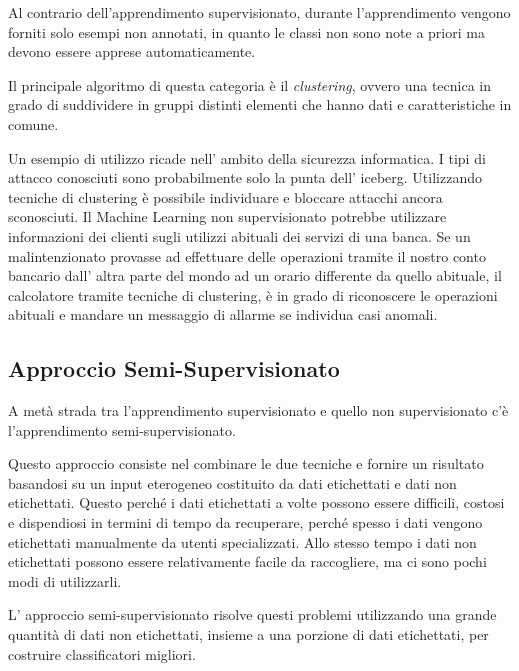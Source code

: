 \documentclass[a4paper,12pt]{report}
\begin{document}


Al contrario dell'apprendimento supervisionato, durante l'apprendimento vengono forniti solo esempi non annotati, in quanto le classi non sono note a priori ma devono essere apprese automaticamente.

\bigskip

Il principale algoritmo di questa categoria è il \textit{clustering}, ovvero una tecnica in grado di suddividere in gruppi distinti elementi che hanno dati e caratteristiche in comune.

Un esempio di utilizzo ricade nell' ambito della sicurezza informatica. I tipi di attacco conosciuti sono probabilmente solo la punta dell' iceberg. Utilizzando tecniche di clustering è possibile individuare e bloccare attacchi ancora sconosciuti.
Il Machine Learning non supervisionato potrebbe utilizzare informazioni dei clienti sugli utilizzi abituali dei servizi di una banca. Se un malintenzionato provasse ad effettuare delle operazioni tramite il nostro conto bancario dall' altra parte del mondo ad un orario differente da quello abituale, il calcolatore tramite tecniche di clustering, è in grado di riconoscere le operazioni abituali e mandare un messaggio di allarme se individua casi anomali.

\subsection*{Approccio Semi-Supervisionato}
A metà strada tra l'apprendimento supervisionato e quello non supervisionato c'è l'apprendimento semi-supervisionato.

Questo approccio consiste nel combinare le due tecniche e fornire un risultato basandosi su un input eterogeneo costituito da dati etichettati e dati non etichettati.
Questo perché i dati etichettati a volte possono essere difficili, costosi e dispendiosi in termini di tempo da recuperare, perché spesso i dati vengono etichettati manualmente da utenti specializzati. Allo stesso tempo i dati non etichettati possono essere relativamente facile da raccogliere, ma ci sono pochi modi di utilizzarli. 

L' approccio semi-supervisionato risolve questi problemi utilizzando una grande quantità di dati non etichettati, insieme a una porzione di dati etichettati, per costruire classificatori migliori.
\end{document}
